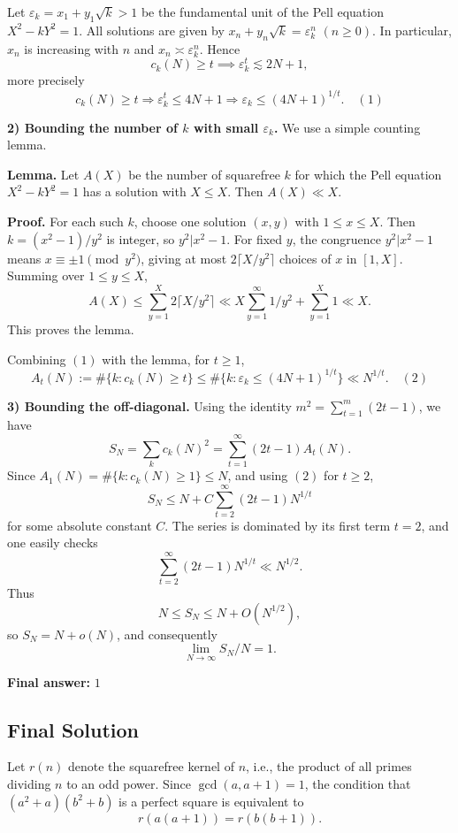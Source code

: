 \documentclass[12pt,a4paper]{article}
\theoremstyle{definition}
\begin{document}
    Let $\varepsilon_k = x_1 + y_1\sqrt{k} > 1$ be the fundamental unit of the Pell equation $X^2 - k Y^2 = 1$. All solutions are given by $x_n + y_n\sqrt{k} = \varepsilon_k^n$ $(n\geq 0)$. In particular, $x_n$ is increasing with $n$ and $x_n \asymp \varepsilon_k^n$. Hence
    $$c_k(N) \geq t \implies \varepsilon_k^t \lesssim 2N+1,$$
    more precisely
    $$c_k(N) \geq t \Rightarrow \varepsilon_k^t \leq 4N+1 \Rightarrow \varepsilon_k \leq (4N+1)^{1/t}. \quad (1)$$

    \textbf{2) Bounding the number of $k$ with small $\varepsilon_k$.} We use a simple counting lemma.

    \textbf{Lemma.} Let $A(X)$ be the number of squarefree $k$ for which the Pell equation $X^2 - k Y^2 = 1$ has a solution with $X \leq X$. Then $A(X) \ll X$.

    \textbf{Proof.} For each such $k$, choose one solution $(x,y)$ with $1 \leq x \leq X$. Then $k = (x^2 - 1)/y^2$ is integer, so $y^2 | x^2 - 1$. For fixed $y$, the congruence $y^2 | x^2 - 1$ means $x \equiv \pm 1 \pmod{y^2}$, giving at most $2\lceil X/y^2 \rceil$ choices of $x$ in $[1,X]$. Summing over $1 \leq y \leq X$,
    $$A(X) \leq \sum_{y=1}^X 2\lceil X/y^2 \rceil \ll X \sum_{y=1}^\infty 1/y^2 + \sum_{y=1}^X 1 \ll X.$$
    This proves the lemma.

    Combining $(1)$ with the lemma, for $t \geq 1$,
    $$A_t(N) := \#\{k : c_k(N) \geq t\} \leq \#\{k : \varepsilon_k \leq (4N+1)^{1/t}\} \ll N^{1/t}. \quad (2)$$

    \textbf{3) Bounding the off-diagonal.} Using the identity $m^2 = \sum_{t=1}^m (2t-1)$, we have
    $$S_N = \sum_k c_k(N)^2 = \sum_{t=1}^\infty (2t-1) A_t(N).$$
    Since $A_1(N) = \#\{k : c_k(N) \geq 1\} \leq N$, and using $(2)$ for $t \geq 2$,
    $$S_N \leq N + C \sum_{t=2}^\infty (2t-1) N^{1/t}$$
    for some absolute constant $C$. The series is dominated by its first term $t=2$, and one easily checks
    $$\sum_{t=2}^\infty (2t-1) N^{1/t} \ll N^{1/2}.$$
    Thus
    $$N \leq S_N \leq N + O(N^{1/2}),$$
    so $S_N = N + o(N)$, and consequently
    $$\lim_{N\to\infty} S_N/N = 1.$$

    \textbf{Final answer:} $1$

    \subsection{Final Solution}
    Let $r(n)$ denote the squarefree kernel of $n$, i.e., the product of all primes dividing $n$ to an odd power. Since $\gcd(a, a+1)=1$, the condition that $(a^2+a)(b^2+b)$ is a perfect square is equivalent to
    $$r(a(a+1)) = r(b(b+1)).$$
\end{document}
